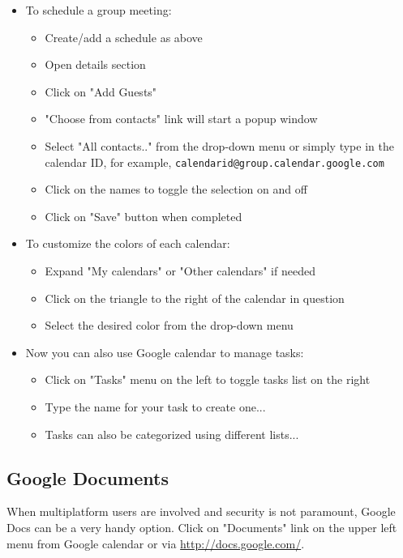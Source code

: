 \documentclass[12pt,a4paper]{article}
\begin{document}
\begin{itemize}
\begin{itemize}
        \end{itemize}
    \item To schedule a group meeting:
        \begin{itemize}
            \item Create/add a schedule as above
            \item Open details section
            \item Click on "Add Guests"
            \item "Choose from contacts" link will start a popup window
            \item Select "All contacts.." from the drop-down menu or simply type in the calendar ID, for example, \texttt{calendarid@group.calendar.google.com}
            \item Click on the names to toggle the selection on and off
            \item Click on "Save" button when completed
        \end{itemize}
    \item To customize the colors of each calendar:
        \begin{itemize}
            \item Expand "My calendars" or "Other calendars" if needed
            \item Click on the triangle to the right of the calendar in question
            \item Select the desired color from the drop-down menu
        \end{itemize}
    \item Now you can also use Google calendar to manage tasks:
        \begin{itemize}
            \item Click on "Tasks" menu on the left to toggle tasks list on the right
            \item Type the name for your task to create one...
            \item Tasks can also be categorized using different lists...
        \end{itemize}
\end{itemize}

\subsection*{Google Documents}
When multiplatform users are involved and security is not paramount, Google Docs can be a very handy option.
Click on "Documents" link on the upper left menu from Google calendar or via \url{http://docs.google.com/}.
\end{document}
